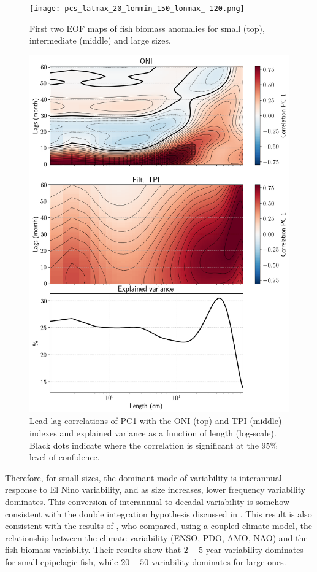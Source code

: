 \begin{figure}
    \centering
    \texttt{[image: pcs\_latmax\_20\_lonmin\_150\_lonmax\_-120.png]}
    \caption{First two EOF maps of fish biomass anomalies for small (top), intermediate (middle) and large sizes.}
    \label{fig:eofpcs}
\end{figure}

\begin{figure}
    \centering
    \includegraphics[scale=0.5]{figs/correlations_eof_oni_tpi_eof_1.png}
    \caption{Lead-lag correlations of PC1 with the ONI (top) and TPI (middle) indexes and explained variance as a function of length (log-scale). Black dots indicate where the correlation is significant at the $95\%$ level of confidence.}
    \label{fig:pc_corrs}
\end{figure}

Therefore, for small sizes, the dominant mode of variability is interannual response to El Nino variability, and as size increases, lower frequency variability dominates. This conversion of interannual to decadal variability is somehow consistent with the double integration hypothesis discussed in \cite{lorenzoDoubleintegrationHypothesisExplain2013}. This result is also consistent with the results of \cite{lemezoNaturalVariabilityMarine2016}, who compared, using a coupled climate model, the relationship between the climate variability (ENSO, PDO, AMO, NAO) and the fish biomass variabilty. Their results show that $2-5$ year variability dominates for small epipelagic fish, while $20-50$ variability dominates for large ones.




